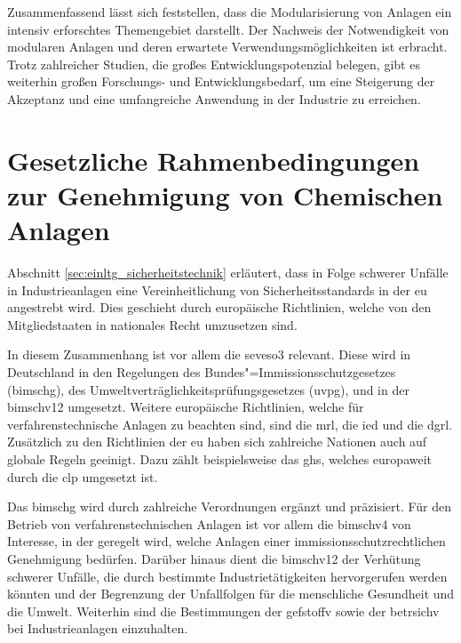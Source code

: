 Zusammenfassend l\"asst sich feststellen, dass die Modularisierung von Anlagen ein intensiv erforschtes Themengebiet darstellt. Der Nachweis der Notwendigkeit von modularen Anlagen und deren erwartete Verwendungsm\"oglichkeiten ist erbracht. Trotz zahlreicher Studien, die gro\ss{}es Entwicklungspotenzial belegen, gibt es weiterhin gro\ss{}en Forschungs- und Entwicklungsbedarf, um eine Steigerung der Akzeptanz und eine umfangreiche Anwendung in der Industrie zu erreichen.

\section{Gesetzliche Rahmenbedingungen zur Genehmigung von Chemischen Anlagen}\label{sdt_gesetze}
Abschnitt \ref{sec:einltg_sicherheitstechnik} erl\"autert, dass in Folge schwerer Unf\"alle in Industrieanlagen eine Vereinheitlichung von Sicherheitsstandards in der \ac{eu} angestrebt wird. Dies geschieht durch europ\"aische Richtlinien, welche von den Mitgliedstaaten in nationales Recht umzusetzen sind.

In diesem Zusammenhang ist vor allem die \ac{seveso3} relevant. Diese wird in Deutschland in den Regelungen des Bundes"=Immissionsschutzgesetzes (\ac{bimschg}), des Umweltvertr\"aglichkeitspr\"ufungsgesetzes (\ac{uvpg}), und in der \acf{bimschv12} umgesetzt. Weitere europ\"aische Richtlinien, welche f\"ur verfahrenstechnische Anlagen zu beachten sind, sind die \ac{mrl}, die \ac{ied} und die \ac{dgrl}. \newline
Zus\"atzlich zu den Richtlinien der \ac{eu} haben sich zahlreiche Nationen auch auf globale Regeln geeinigt. Dazu z\"ahlt beispielsweise das \ac{ghs}, welches europaweit durch die \ac{clp} umgesetzt ist.

Das \ac{bimschg} wird durch zahlreiche Verordnungen erg\"anzt und pr\"azisiert. \newline
F\"ur den Betrieb von verfahrenstechnischen Anlagen ist vor allem die \ac{bimschv4} von Interesse, in der geregelt wird, welche Anlagen einer immissionsschutzrechtlichen Genehmigung bed\"urfen. \newline
Dar\"uber hinaus dient die \ac{bimschv12} der Verh\"utung schwerer Unf\"alle, die durch bestimmte Industriet\"atigkeiten hervorgerufen werden k\"onnten und der Begrenzung der Unfallfolgen für die menschliche Gesundheit und die Umwelt. Weiterhin sind die Bestimmungen der \ac{gefstoffv} sowie der \ac{betrsichv} bei Industrieanlagen einzuhalten.

